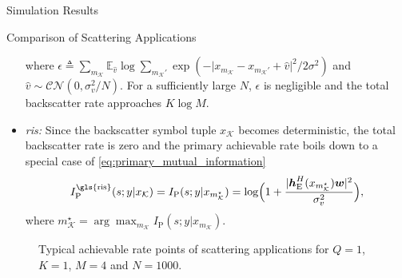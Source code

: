 \documentclass[journal]{IEEEtran}
\begin{document}
\begin{section}{Simulation Results}
\begin{subsection}{Comparison of Scattering Applications}
\begin{itemize}
\begin{equation}
			\end{equation}
			where $\epsilon \triangleq \sum_{m_{\mathcal{K}}} \mathbb{E}_{\hat{v}} \log \sum_{m_{\mathcal{K}}'} \exp ( - {\lvert x_{m_{\mathcal{K}}} - x_{m_{\mathcal{K}}'} + \hat{v} \rvert^2}/{2 \sigma^2} )$ and $\hat{v} \sim \mathcal{CN}(0,\sigma_v^2/N)$.
			For a sufficiently large $N$, $\epsilon$ is negligible and the total backscatter rate approaches $K \log M$.
			\item \emph{\gls{ris}:} Since the backscatter symbol tuple $x_{\mathcal{K}}$ becomes deterministic, the total backscatter rate is zero and the primary achievable rate boils down to a special case of \eqref{eq:primary_mutual_information}
			\begin{equation}
				I_{\mathrm{P}}^{\text{\gls{ris}}}(s;y|x_{\mathcal{K}}) = I_{\mathrm{P}}(s;y|x_{m_{\mathcal{K}}^{\star}}) = \log \Bigl(1 + \frac{\lvert \boldsymbol{h}_{\mathrm{E}}^H(x_{m_{\mathcal{K}}^{\star}}) \boldsymbol{w} \rvert^2}{\sigma_v^2}\Bigr),
			\end{equation}
			where $m_{\mathcal{K}}^{\star} = \arg \max_{m_{\mathcal{K}}} I_{\mathrm{P}}(s;y|x_{m_{\mathcal{K}}})$.
		\end{itemize}
		\begin{figure}[!t]
			\centering
			\resizebox{0.65\columnwidth}{!}{
				
			}
			\caption{Typical achievable rate points of scattering applications for $Q=1$, $K=1$, $M=4$ and $N=1000$.}
			\label{fg:region_comparison}
		\end{figure}


\end{subsection}
\end{section}
\end{document}
